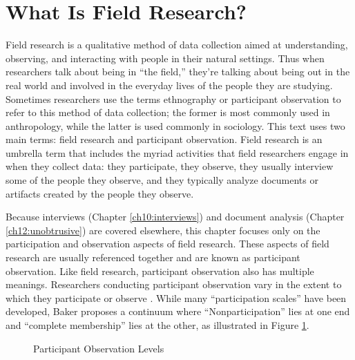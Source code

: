 \section{What Is Field Research?}

Field research is a qualitative method of data collection aimed at understanding, observing, and interacting with people in their natural settings. Thus when researchers talk about being in ``the field,'' they’re talking about being out in the real world and involved in the everyday lives of the people they are studying. Sometimes researchers use the terms ethnography or participant observation to refer to this method of data collection; the former is most commonly used in anthropology, while the latter is used commonly in sociology. This text uses two main terms: field research and participant observation. Field research is an umbrella term that includes the myriad activities that field researchers engage in when they collect data: they participate, they observe, they usually interview some of the people they observe, and they typically analyze documents or artifacts created by the people they observe.

Because interviews (Chapter \ref{ch10:interviews}) and document analysis (Chapter \ref{ch12:unobtrusive}) are covered elsewhere, this chapter focuses only on the participation and observation aspects of field research. These aspects of field research are usually referenced together and are known as participant observation. Like field research, participant observation also has multiple meanings. Researchers conducting participant observation vary in the extent to which they participate or observe \cite{baker2006observation}. While many ``participation scales'' have been developed, Baker proposes a continuum where ``Nonparticipation'' lies at one end and ``complete membership'' lies at the other, as illustrated in Figure \ref{11:fig01}.

\begin{center}
	\begin{figure}[H]
		\caption{Participant Observation Levels}
		\label{11:fig01}
	\end{figure}
\end{center}


